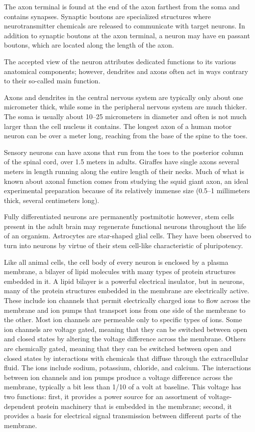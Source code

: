 \documentclass[]{book}
\begin{document}
The axon terminal is found at the end of the axon farthest from the soma and contains synapses. Synaptic boutons are specialized structures where neurotransmitter chemicals are released to communicate with target neurons. In addition to synaptic boutons at the axon terminal, a neuron may have en passant boutons, which are located along the length of the axon.

The accepted view of the neuron attributes dedicated functions to its various anatomical components; however, dendrites and axons often act in ways contrary to their so-called main function.

Axons and dendrites in the central nervous system are typically only about one micrometer thick, while some in the peripheral nervous system are much thicker. The soma is usually about 10--25 micrometers in diameter and often is not much larger than the cell nucleus it contains. The longest axon of a human motor neuron can be over a meter long, reaching from the base of the spine to the toes.

Sensory neurons can have axons that run from the toes to the posterior column of the spinal cord, over 1.5 meters in adults. Giraffes have single axons several meters in length running along the entire length of their necks. Much of what is known about axonal function comes from studying the squid giant axon, an ideal experimental preparation because of its relatively immense size (0.5--1 millimeters thick, several centimeters long).

Fully differentiated neurons are permanently postmitotic however, stem cells present in the adult brain may regenerate functional neurons throughout the life of an organism. Astrocytes are star-shaped glial cells. They have been observed to turn into neurons by virtue of their stem cell-like characteristic of pluripotency.

Like all animal cells, the cell body of every neuron is enclosed by a plasma membrane, a bilayer of lipid molecules with many types of protein structures embedded in it. A lipid bilayer is a powerful electrical insulator, but in neurons, many of the protein structures embedded in the membrane are electrically active. These include ion channels that permit electrically charged ions to flow across the membrane and ion pumps that transport ions from one side of the membrane to the other. Most ion channels are permeable only to specific types of ions. Some ion channels are voltage gated, meaning that they can be switched between open and closed states by altering the voltage difference across the membrane. Others are chemically gated, meaning that they can be switched between open and closed states by interactions with chemicals that diffuse through the extracellular fluid. The ions include sodium, potassium, chloride, and calcium. The interactions between ion channels and ion pumps produce a voltage difference across the membrane, typically a bit less than 1/10 of a volt at baseline. This voltage has two functions: first, it provides a power source for an assortment of voltage-dependent protein machinery that is embedded in the membrane; second, it provides a basis for electrical signal transmission between different parts of the membrane.
\end{document}
